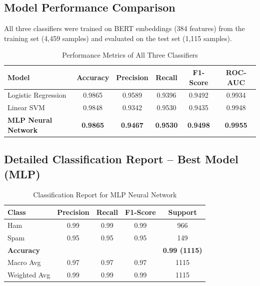 \documentclass[12pt,a4paper]{article}
\begin{document}
\subsection{Model Performance Comparison}

All three classifiers were trained on BERT embeddings (384 features) from the training set (4,459 samples) and evaluated on the test set (1,115 samples).

\begin{table}[H]
\centering
\renewcommand{\arraystretch}{1.4}
\begin{tabular}{|l|c|c|c|c|c|}
\hline
\textbf{Model} & \textbf{Accuracy} & \textbf{Precision} & \textbf{Recall} & \textbf{F1-Score} & \textbf{ROC-AUC} \\
\hline
Logistic Regression     & 0.9865 & 0.9589 & 0.9396 & 0.9492 & 0.9934 \\
\hline
Linear SVM              & 0.9848 & 0.9342 & 0.9530 & 0.9435 & 0.9948 \\
\hline
\textbf{MLP Neural Network} & \textbf{0.9865} & \textbf{0.9467} & \textbf{0.9530} & \textbf{0.9498} & \textbf{0.9955} \\
\hline
\end{tabular}
\caption{Performance Metrics of All Three Classifiers}
\end{table}

\subsection{Detailed Classification Report -- Best Model (MLP)}

\begin{table}[H]
\centering
\renewcommand{\arraystretch}{1.3}
\begin{tabular}{|l|c|c|c|c|}
\hline
\textbf{Class} & \textbf{Precision} & \textbf{Recall} & \textbf{F1-Score} & \textbf{Support} \\
\hline
Ham     & 0.99 & 0.99 & 0.99 & 966 \\
Spam    & 0.95 & 0.95 & 0.95 & 149 \\
\hline
\textbf{Accuracy}       & \multicolumn{3}{c|}{}          & \textbf{0.99 (1115)} \\
\hline
Macro Avg       & 0.97 & 0.97 & 0.97 & 1115 \\
Weighted Avg    & 0.99 & 0.99 & 0.99 & 1115 \\
\hline
\end{tabular}
\caption{Classification Report for MLP Neural Network}
\end{table}
\end{document}
